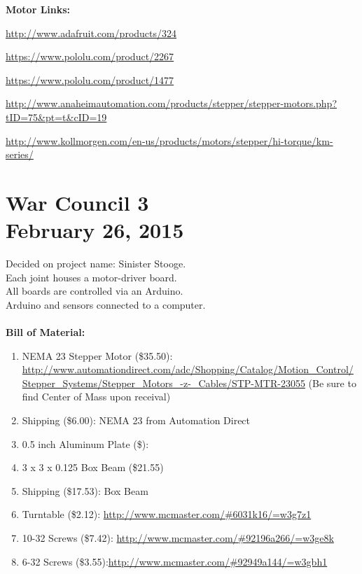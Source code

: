 \documentclass[11pt]{article}
\begin{document}

\noindent \textbf{Motor Links:}
\begin{compactitem}
	\item \url{http://www.adafruit.com/products/324}
	\item \url{https://www.pololu.com/product/2267}
	\item \url{https://www.pololu.com/product/1477}
	\item \url{http://www.anaheimautomation.com/products/stepper/stepper-motors.php?tID=75&pt=t&cID=19}
	\item \url{http://www.kollmorgen.com/en-us/products/motors/stepper/hi-torque/km-series/}
\end{compactitem}

\section{War Council 3 \\ February 26, 2015}
Decided on project name: Sinister Stooge.\\
Each joint houses a motor-driver board.\\
All boards are controlled via an Arduino.\\
Arduino and sensors connected to a computer.\\
\\
\noindent \textbf{Bill of Material:}\\
\begin{enumerate}
	\item NEMA 23 Stepper Motor (\$35.50): \url{http://www.automationdirect.com/adc/Shopping/Catalog/Motion_Control/Stepper_Systems/Stepper_Motors_-z-_Cables/STP-MTR-23055} (Be sure to find Center of Mass upon receival)
	\item Shipping (\$6.00): NEMA 23 from Automation Direct
	\item 0.5 inch Aluminum Plate (\$):
	\item 3 x 3 x 0.125 Box Beam (\$21.55)
	\item Shipping (\$17.53): Box Beam
	\item Turntable (\$2.12): \url{http://www.mcmaster.com/#6031k16/=w3g7z1}
	\item 10-32 Screws (\$7.42): \url{http://www.mcmaster.com/#92196a266/=w3ge8k}
	\item 6-32 Screws (\$3.55):\url{http://www.mcmaster.com/#92949a144/=w3gbh1}
\end{enumerate}
\end{document}
